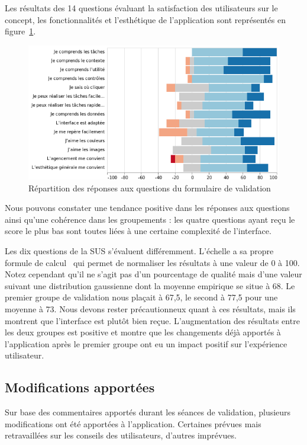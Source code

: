 \documentclass{EPL-master-thesis-covers-FR}
\begin{document}
				Les résultats des 14 questions évaluant la satisfaction des utilisateurs sur le concept, les fonctionnalités et l'esthétique de l'application sont représentés en figure~\ref{fig:validation_likert}.

				\begin{figure}[H]
					\includegraphics[width=\textwidth]{images/likert_questions}
					\caption{Répartition des réponses aux questions du formulaire de validation}
					\label{fig:validation_likert}
				\end{figure}

				Nous pouvons constater une tendance positive dans les réponses aux questions ainsi qu'une cohérence dans les groupements : les quatre questions ayant reçu le score le plus bas sont toutes liées à une certaine complexité de l'interface.

				Les dix questions de la SUS s'évaluent différemment. L'échelle a sa propre formule de calcul~\cite{ref:sus} qui permet de normaliser les résultats à une valeur de 0 à 100. Notez cependant qu'il ne s'agit pas d'un pourcentage de qualité mais d'une valeur suivant une distribution gaussienne dont la moyenne empirique se situe à 68. Le premier groupe de validation nous plaçait à 67,5, le second à 77,5 pour une moyenne à 73. Nous devons rester précautionneux quant à ces résultats, mais ils montrent que l'interface est plutôt bien reçue. L'augmentation des résultats entre les deux groupes est positive et montre que les changements déjà apportés à l'application après le premier groupe ont eu un impact positif sur l'expérience utilisateur.

			\subsection*{Modifications apportées}
				Sur base des commentaires apportés durant les séances de validation, plusieurs modifications ont été apportées à l'application. Certaines prévues mais retravaillées sur les conseils des utilisateurs, d'autres imprévues.
\end{document}

